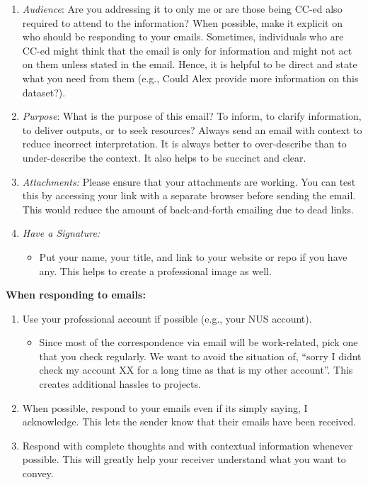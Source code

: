 \documentclass[
]{book}
\providecommand{\tightlist}{%
  \setlength{\itemsep}{0pt}\setlength{\parskip}{0pt}}
\begin{document}
\begin{enumerate}
\def\labelenumi{\arabic{enumi}.}
\item
  \emph{Audience}: Are you addressing it to only me or are those being CC-ed also required to attend to the information? When possible, make it explicit on who should be responding to your emails. Sometimes, individuals who are CC-ed might think that the email is only for information and might not act on them unless stated in the email. Hence, it is helpful to be direct and state what you need from them (e.g., Could Alex provide more information on this dataset?).
\item
  \emph{Purpose}: What is the purpose of this email? To inform, to clarify information, to deliver outputs, or to seek resources? Always send an email with context to reduce incorrect interpretation. It is always better to over-describe than to under-describe the context. It also helps to be succinct and clear.
\item
  \emph{Attachments:} Please ensure that your attachments are working. You can test this by accessing your link with a separate browser before sending the email. This would reduce the amount of back-and-forth emailing due to dead links.
\item
  \emph{Have a Signature:}

  \begin{itemize}
  \tightlist
  \item
    Put your name, your title, and link to your website or repo if you have any. This helps to create a professional image as well.
  \end{itemize}
\end{enumerate}

\textbf{When responding to emails:}

\begin{enumerate}
\def\labelenumi{\arabic{enumi}.}
\item
  Use your professional account if possible (e.g., your NUS account).

  \begin{itemize}
  \tightlist
  \item
    Since most of the correspondence via email will be work-related, pick one that you check regularly. We want to avoid the situation of, ``sorry I didnt check my account XX for a long time as that is my other account''. This creates additional hassles to projects.
  \end{itemize}
\item
  When possible, respond to your emails even if its simply saying, I acknowledge. This lets the sender know that their emails have been received.
\item
  Respond with complete thoughts and with contextual information whenever possible. This will greatly help your receiver understand what you want to convey.
\end{enumerate}
\end{document}
